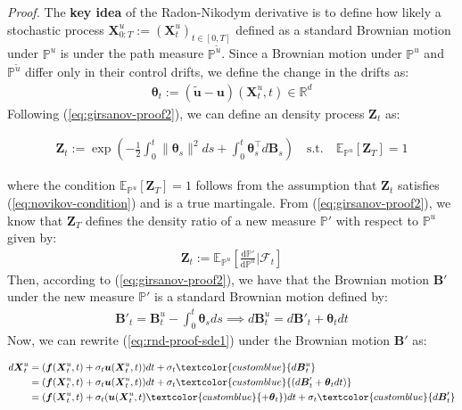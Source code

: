 \documentclass{article}
\newcommand{\bluetext}[1]{\textcolor{customblue}{#1}}
\begin{document}
\textit{Proof.} The \textbf{key idea} of the Radon-Nikodym derivative is to define how likely a stochastic process $\boldsymbol{X}^u_{0:T}:=(\boldsymbol{X}^u_t)_{t\in [0,T]}$ defined as a standard Brownian motion under $\mathbb{P}^u$ is under the path measure $\mathbb{P}^{\tilde{u}}$. Since a Brownian motion under $\mathbb{P}^u$ and $\mathbb{P}^{\tilde{u}}$ differ only in their control drifts, we define the change in the drifts as:
\begin{align}
    \boldsymbol{\theta}_t:=(\tilde{\boldsymbol{u}}-\boldsymbol{u})(\boldsymbol{X}^u_t,t)\in \mathbb{R}^d
\end{align}
Following (\ref{eq:girsanov-proof2}), we can define an density process $\boldsymbol{Z}_t$ as:
\begin{small}
\begin{align}
    \boldsymbol{Z}_t:=\exp\left(-\frac{1}{2}\int_0^t\|\boldsymbol{\theta}_s\|^2ds+\int_0^t\boldsymbol{\theta}_s^\top d\boldsymbol{B}_s\right)\quad \text{s.t.} \quad \mathbb{E}_{\mathbb{P}^u}\left[\boldsymbol{Z}_T\right]=1
\end{align}
\end{small}
where the condition $\mathbb{E}_{\mathbb{P}^u}\left[\boldsymbol{Z}_T\right]=1$ follows from the assumption that $\boldsymbol{Z}_t$ satisfies (\ref{eq:novikov-condition}) and is a true martingale. From (\ref{eq:girsanov-proof2}), we know that $\boldsymbol{Z}_T$ defines the density ratio of a new measure $\mathbb{P}'$ with respect to $\mathbb{P}^u$ given by:
\begin{align}
    \boldsymbol{Z}_t:= \mathbb{E}_{\mathbb{P}^u}\left[\frac{\mathrm{d}\mathbb{P}'}{\mathrm{d}\mathbb{P}^u}\bigg|\mathcal{F}_t\right]
\end{align}
Then, according to (\ref{eq:girsanov-proof2}), we have that the Brownian motion $\boldsymbol{B}'$ under the new measure $\mathbb{P}'$ is a standard Brownian motion defined by:
\begin{align}
    \boldsymbol{B}'_t=\boldsymbol{B}^u_t-\int_0^t\boldsymbol{\theta}_sds\implies d\boldsymbol{B}^u_t=d\boldsymbol{B}'_t+\boldsymbol{\theta}_tdt
\end{align}
Now, we can rewrite (\ref{eq:rnd-proof-sde1}) under the Brownian motion $\boldsymbol{B}'$ as:
\begin{small}
\begin{align}
    d\boldsymbol{X}^u_t&=(\boldsymbol{f}(\boldsymbol{X}^u_t,t)+\sigma_t\boldsymbol{u}(\boldsymbol{X}^u_t,t)) dt+\sigma_t \bluetext{d\boldsymbol{B}^u_t}\nonumber\\
    &=(\boldsymbol{f}(\boldsymbol{X}^u_t,t)+\sigma_t\boldsymbol{u}(\boldsymbol{X}^u_t,t)) dt+\sigma_t \bluetext{(d\boldsymbol{B}'_t+\boldsymbol{\theta}_tdt)}\nonumber\\
    &=(\boldsymbol{f}(\boldsymbol{X}^u_t,t)+\sigma_t(\boldsymbol{u}(\boldsymbol{X}^u_t,t)\bluetext{+\boldsymbol{\theta}_t}) dt+\sigma_t \bluetext{d\boldsymbol{B}'_t}
\end{align}
\end{small}
\end{document}
